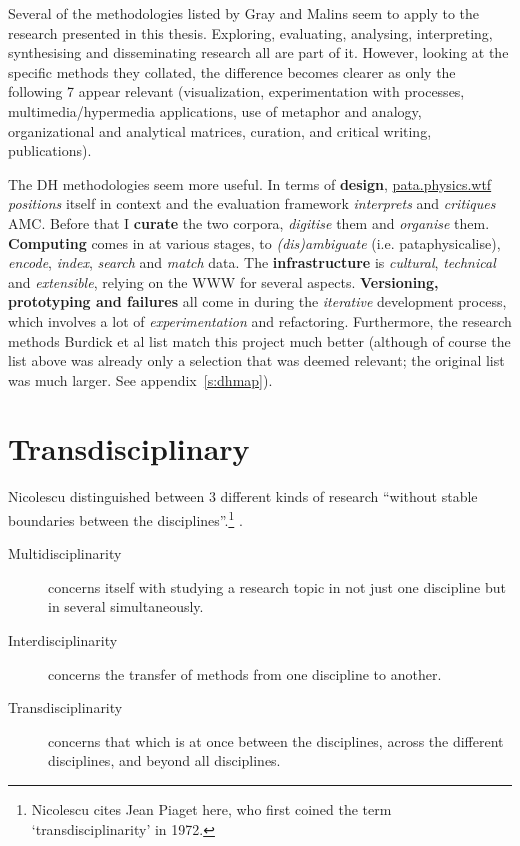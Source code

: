 \spirals

Several of the methodologies listed by Gray and Malins \autocite*{Gray2004} seem to apply to the research presented in this thesis. Exploring, evaluating, analysing, interpreting, synthesising and disseminating research all are part of it. However, looking at the specific methods they collated, the difference becomes clearer as only the following 7 appear relevant (visualization, experimentation with processes, multimedia/hypermedia applications, use of metaphor and analogy, organizational and analytical matrices, curation, and critical writing, publications).

The \ac{DH} methodologies seem more useful. In terms of \textbf{design}, \url{pata.physics.wtf} \textit{positions} itself in context and the evaluation framework \textit{interprets} and \textit{critiques} \ac{AMC}. Before that I \textbf{curate} the two corpora, \textit{digitise} them and \textit{organise} them. \textbf{Computing} comes in at various stages, to \textit{(dis)ambiguate} (i.e. pataphysicalise), \textit{encode}, \textit{index}, \textit{search} and \textit{match} data. The \textbf{infrastructure} is \textit{cultural}, \textit{technical} and \textit{extensible}, relying on the \ac{WWW} for several aspects. \textbf{Versioning, prototyping and failures} all come in during the \textit{iterative} development process, which involves a lot of \textit{experimentation} and refactoring. Furthermore, the research methods Burdick et al \autocite*{Burdick2012} list match this project much better (although of course the list above was already only a selection that was deemed relevant; the original list was much larger. See appendix~\ref{s:dhmap}).


\section{Transdisciplinary}

Nicolescu distinguished between 3 different kinds of research ``without stable boundaries between the disciplines''.\footnote{Nicolescu cites Jean Piaget here, who first coined the term `transdisciplinarity' in 1972.} \autocite*{Nicolescu2010}.

\begin{description}
  \item [Multidisciplinarity]	concerns itself with studying a research topic in not just one discipline but in several simultaneously.
  \item [Interdisciplinarity]	concerns the transfer of methods from one discipline to another.
  \item [Transdisciplinarity]	concerns that which is at once between the disciplines, across the different disciplines, and beyond all disciplines.
\end{description}

